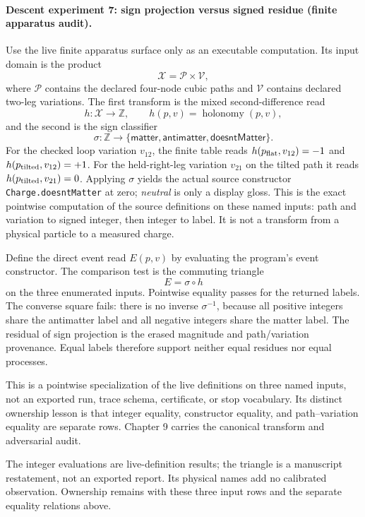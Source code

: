 \paragraph{Descent experiment 7: sign projection versus signed residue (finite apparatus audit).}
Use the live finite apparatus surface only as an executable computation.  Its input domain is the product
\[
 \mathcal X=\mathcal P\times\mathcal V,
\]
where \(\mathcal P\) contains the declared four-node cubic paths and \(\mathcal V\) contains declared two-leg
variations.  The first transform is the mixed second-difference read
\[
 h:\mathcal X\to\mathbb Z,\qquad h(p,v)=\operatorname{holonomy}(p,v),
\]
and the second is the sign classifier
\[
 \sigma:\mathbb Z\to
 \{\mathsf{matter},\mathsf{antimatter},\mathsf{doesntMatter}\}.
\]
For the checked loop variation \(v_{12}\), the finite table reads
\(h(p_{\rm flat},v_{12})=-1\) and \(h(p_{\rm tilted},v_{12})=+1\).  For the held-right-leg variation \(v_{21}\) on
the tilted path it reads \(h(p_{\rm tilted},v_{21})=0\).  Applying \(\sigma\) yields the actual source constructor
\texttt{Charge.doesntMatter} at zero; \emph{neutral} is only a display gloss.  This is
the exact pointwise computation of the source definitions on these named inputs: path and variation to signed
integer, then integer to label.  It is
not a transform from a physical particle to a measured charge.

Define the direct event read \(E(p,v)\) by evaluating the program's event constructor.  The comparison test is the
commuting triangle
\[
                       E=\sigma\circ h
\]
on the three enumerated inputs.  Pointwise equality passes for the returned labels.  The converse square fails:
there is no inverse \(\sigma^{-1}\), because all positive integers share the antimatter label and all negative
integers share the matter label.  The residual of sign projection is the erased magnitude and path/variation
provenance.  Equal labels therefore support neither equal residues nor equal processes.

This is a pointwise specialization of the live definitions on three named inputs, not an exported run, trace schema,
certificate, or stop vocabulary.  Its distinct ownership lesson is that integer equality, constructor equality, and
path--variation equality are separate rows.  Chapter 9 carries the canonical transform and adversarial audit.

The integer evaluations are live-definition results; the triangle is a manuscript restatement, not an exported
report.  Its physical names add no calibrated observation.  Ownership remains with these three input rows and the
separate equality relations above.
